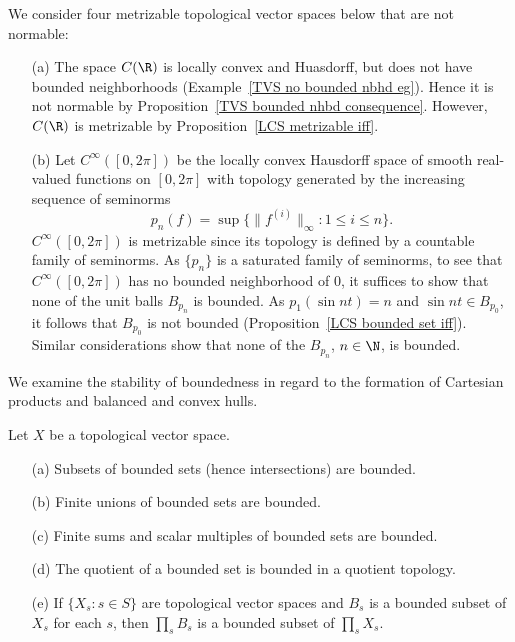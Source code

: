 \begin{example}
We consider four metrizable topological vector spaces below that are not normable:
\begin{itemize}
\item[(a)] The space $C(\R)$ is locally convex and Huasdorff, but does not have bounded neighborhoods (Example~\ref{TVS no bounded nbhd eg}). Hence it is not normable by Proposition~\ref{TVS bounded nhbd consequence}. However, $C(\R)$ is metrizable by Proposition~\ref{LCS metrizable iff}. 
\item[(b)] Let $C^\infty([0,2\pi])$ be the locally convex Hausdorff space of smooth real-valued functions on $[0,2\pi]$ with topology generated by the increasing sequence of seminorms
\[p_n(f)=\sup\{\|f^{(i)}\|_\infty:1\leq i\leq n\}.\] 
$C^\infty([0,2\pi])$ is metrizable since its topology is defined by a countable family of seminorms. As $\{p_n\}$ is a saturated family of seminorms, to see that $C^\infty([0,2\pi])$ has no bounded neighborhood of $0$, it suffices to show that none of the unit balls $B_{p_n}$ is bounded. As $p_1(\sin nt)=n$ and $\sin nt\in B_{p_0}$, it follows that $B_{p_0}$ is not bounded (Proposition~\ref{LCS bounded set iff}). Similar considerations show that none of the $B_{p_n}$, $n\in\N$, is bounded.
\end{itemize}
\end{example}
We examine the stability of boundedness in regard to the formation of Cartesian products and balanced and convex hulls.
\begin{proposition}\label{TVS bounded set union sum product}
Let $X$ be a topological vector space.
\begin{itemize}
\item[(a)] Subsets of bounded sets (hence intersections) are bounded.
\item[(b)] Finite unions of bounded sets are bounded.
\item[(c)] Finite sums and scalar multiples of bounded sets are bounded.
\item[(d)] The quotient of a bounded set is bounded in a quotient topology.
\item[(e)] If $\{X_s:s\in S\}$ are topological vector spaces and $B_s$ is a bounded subset of $X_s$ for each $s$, then $\prod_sB_s$ is a bounded subset of $\prod_sX_s$. 
\end{itemize}
\end{proposition}
